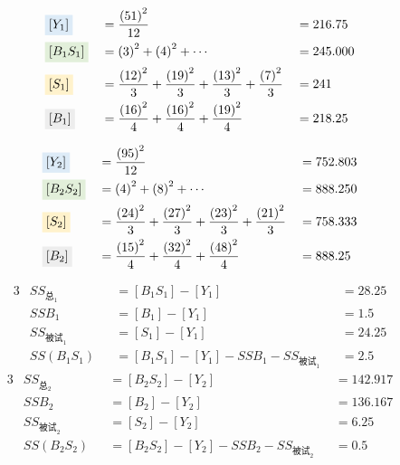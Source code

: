 \begin{alignat*}{3}
    &    \colorbox[rgb]{ .867,  .922,  .969}{$[Y_1]$}
    &&   =\frac{\left( 51 \right) ^2}{12}
    &&   =216.75\\
    &    \colorbox[rgb]{ .886,  .937,  .855}{$[B_1S_1]$}
    &&   = \left( 3 \right) ^2+\left( 4 \right) ^2+\cdots 
    &&   =245.000\\
    &    \colorbox[rgb]{ 1,  .949,  .8}{$[S_1]$}
    &&   =\frac{\left( 12 \right) ^2}{3}+\frac{\left( 19 \right) ^2}{3}+\frac{\left( 13 \right) ^2}{3}+\frac{\left( 7 \right) ^2}{3}
    &&   =241\\
    &    \colorbox[rgb]{ .929,  .929,  .929}{$[B_1]$}
    &&   = \frac{\left( 16 \right) ^2}{4}+\frac{\left( 16 \right) ^2}{4}+\frac{\left( 19 \right) ^2}{4}
    &&   = 218.25
\end{alignat*}




\begin{alignat*}{3}
    &    \colorbox[rgb]{ .867,  .922,  .969}{$[Y_2]$}
    &&   =\frac{\left( 95 \right) ^2}{12}
    &&   =752.803\\
    &    \colorbox[rgb]{ .886,  .937,  .855}{$[B_2S_2]$}
    &&   = \left( 4 \right) ^2+\left( 8 \right) ^2+\cdots 
    &&   =888.250\\
    &    \colorbox[rgb]{ 1,  .949,  .8}{$[S_2]$}
    &&   =\frac{\left( 24 \right) ^2}{3}+\frac{\left( 27 \right) ^2}{3}+\frac{\left( 23 \right) ^2}{3}+\frac{\left( 21 \right) ^2}{3}
    &&   =758.333\\
    &    \colorbox[rgb]{ .929,  .929,  .929}{$[B_2]$}
    &&   = \frac{\left( 15 \right) ^2}{4}+\frac{\left( 32 \right) ^2}{4}+\frac{\left( 48 \right) ^2}{4}
    &&   = 888.25
\end{alignat*}

\begin{alignat*}{3}
    & SS_{总_1}
    &&=\left[ B_1S_1 \right] -\left[ Y_1 \right] 
    &&=28.25\\
    & SSB_1
    &&=\left[ B_1 \right] -\left[ Y_1 \right] 
    &&=1.5\\
    & SS_{\text{被试}_1}
    &&=\left[ S_1 \right] -\left[ Y_1 \right] 
    &&=24.25\\
    & SS\left( B_1S_1 \right) 
    &&=\left[ B_1S_1 \right] -\left[ Y_1 \right] -SSB_1-SS_{\text{被试}_1}
    &&=2.5 
\end{alignat*}
\begin{alignat*}{3}
    & SS_{总_2}
    &&=\left[ B_2S_2 \right] -\left[ Y_2 \right] 
    &&=142.917\\
    & SSB_2
    &&=\left[ B_2 \right] -\left[ Y_2 \right] 
    &&=136.167\\
    & SS_{\text{被试}_2}
    &&=\left[ S_2 \right] -\left[ Y_2 \right] 
    &&=6.25\\
    & SS\left( B_2S_2 \right) 
    &&=\left[ B_2S_2 \right] -\left[ Y_2 \right] -SSB_2-SS_{\text{被试}_2}
    &&=0.5
\end{alignat*}


